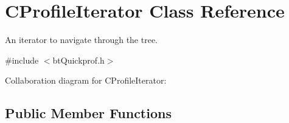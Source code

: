 \hypertarget{class_c_profile_iterator}{\section{C\+Profile\+Iterator Class Reference}
\label{class_c_profile_iterator}
}


An iterator to navigate through the tree.  




{\ttfamily \#include $<$bt\+Quickprof.\+h$>$}



Collaboration diagram for C\+Profile\+Iterator\+:
\subsection*{Public Member Functions}
